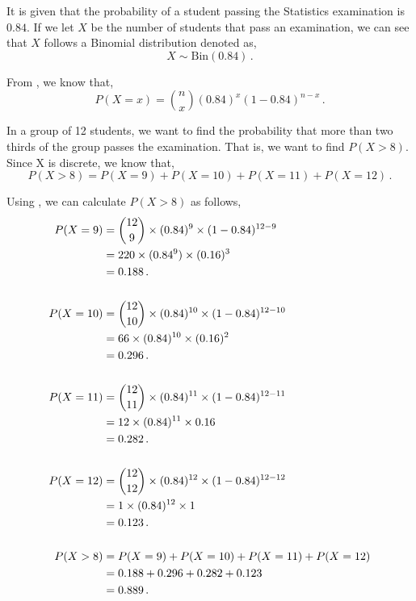 \begin{subquestions}
\begin{subsubquestions}
\end{subsubquestions}
	
	
\subquestion

It is given that the probability of a student passing the Statistics examination is $0.84$. If we let $X$ be the number of students that pass an examination, we can see that $X$ follows a Binomial distribution denoted as,
\begin{equation}
	X \sim \text{Bin}(0.84) \,.
\end{equation} 

From , we know that,
\begin{equation}
	P(X = x) = { n \choose x} (0.84)^x (1-0.84)^{n-x} \,. \label{2011:q4:Bin1}
\end{equation}

In a group of 12 students, we want to find the probability that more than two thirds of the group passes the examination. That is, we want to find $P(X > 8)$. Since X is discrete, we know that,
\begin{equation}
	P(X > 8) = P(X=9)+P(X=10)+P(X=11)+P(X=12) \,.
\end{equation}

Using , we can calculate $P(X > 8)$ as follows,
\begin{align}
	P(X=9) & = { 12 \choose 9} \times (0.84)^9 \times (1-0.84)^{12-9} \nonumber \\
	       & = 220 \times (0.84^9) \times (0.16)^3 \nonumber \\
	       & = 0.188 \,. \\ \nonumber \\
	P(X=10) & = { 12 \choose 10} \times (0.84)^{10} \times (1-0.84)^{12-10} \nonumber \\
	        & = 66 \times (0.84)^{10} \times (0.16)^2 \nonumber \\
	        & = 0.296 \,. \\ \nonumber \\
	P(X=11) & = { 12 \choose 11} \times (0.84)^{11} \times (1-0.84)^{12-11} \nonumber \\
	        & = 12 \times (0.84)^{11} \times 0.16 \nonumber \\
	        & = 0.282 \,. \\ \nonumber \\
	P(X=12) & = { 12 \choose 12} \times (0.84)^{12} \times (1-0.84)^{12-12} \nonumber \\
	        & = 1 \times (0.84)^{12} \times 1 \nonumber \\
	        & = 0.123 \,. \\ \nonumber \\
	P(X > 8) & = P(X=9)+P(X=10)+P(X=11)+P(X=12) \nonumber \\
	         & = 0.188+0.296+0.282+0.123 \nonumber \\
	         & = 0.889 \,.        
\end{align}


\end{subquestions}
